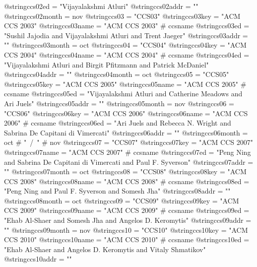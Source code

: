 @string{ccs02ed =               "Vijayalakshmi Atluri"}
@string{ccs02addr =             ""}
@string{ccs02month =            nov}
@string{ccs03 =                 "CCS03"}
@string{ccs03key =              "ACM CCS 2003"}
@string{ccs03name =             "ACM CCS 2003" # ccsname}
@string{ccs03ed =               "Sushil Jajodia and Vijayalakshmi Atluri and Trent Jaeger"}
@string{ccs03addr =             ""}
@string{ccs03month =            oct}
@string{ccs04 =                 "CCS04"}
@string{ccs04key =              "ACM CCS 2004"}
@string{ccs04name =             "ACM CCS 2004" # ccsname}
@string{ccs04ed =               "Vijayalakshmi Atluri and Birgit Pfitzmann and Patrick McDaniel"}
@string{ccs04addr =             ""}
@string{ccs04month =            oct}
@string{ccs05 =                 "CCS05"}
@string{ccs05key =              "ACM CCS 2005"}
@string{ccs05name =             "ACM CCS 2005" # ccsname}
@string{ccs05ed =               "Vijayalakshmi Atluri and Catherine Meadows and Ari Juels"}
@string{ccs05addr =             ""}
@string{ccs05month =            nov}
@string{ccs06 =                 "CCS06"}
@string{ccs06key =              "ACM CCS 2006"}
@string{ccs06name =             "ACM CCS 2006" # ccsname}
@string{ccs06ed =               "Ari Juels and Rebecca N. Wright and Sabrina {De Capitani di Vimercati}"}
@string{ccs06addr =             ""}
@string{ccs06month =            oct # "~/~" # nov}
@string{ccs07 =                 "CCS07"}
@string{ccs07key =              "ACM CCS 2007"}
@string{ccs07name =             "ACM CCS 2007" # ccsname}
@string{ccs07ed =               "Peng Ning and Sabrina {De Capitani di Vimercati} and Paul F. Syverson"}
@string{ccs07addr =             ""}
@string{ccs07month =            oct}
@string{ccs08 =                 "CCS08"}
@string{ccs08key =              "ACM CCS 2008"}
@string{ccs08name =             "ACM CCS 2008" # ccsname}
@string{ccs08ed =               "Peng Ning and Paul F. Syverson and Somesh Jha"}
@string{ccs08addr =             ""}
@string{ccs08month =            oct}
@string{ccs09 =                 "CCS09"}
@string{ccs09key =              "ACM CCS 2009"}
@string{ccs09name =             "ACM CCS 2009" # ccsname}
@string{ccs09ed =               "Ehab {Al-Shaer} and Somesh Jha and Angelos D. Keromytis"}
@string{ccs09addr =             ""}
@string{ccs09month =            nov}
@string{ccs10 =                 "CCS10"}
@string{ccs10key =              "ACM CCS 2010"}
@string{ccs10name =             "ACM CCS 2010" # ccsname}
@string{ccs10ed =               "Ehab {Al-Shaer} and Angelos D. Keromytis and Vitaly Shmatikov"}
@string{ccs10addr =             ""}
